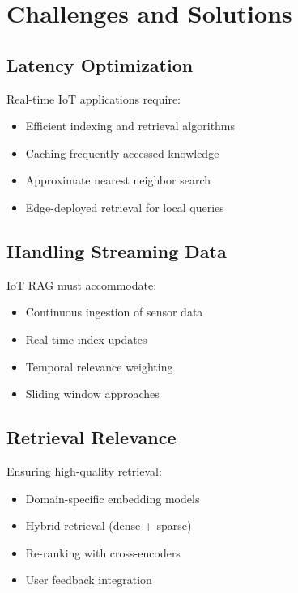 \documentclass[12pt,a4paper]{article}
\begin{document}
\section{Challenges and Solutions}

\subsection{Latency Optimization}

Real-time IoT applications require:
\begin{itemize}
    \item Efficient indexing and retrieval algorithms
    \item Caching frequently accessed knowledge
    \item Approximate nearest neighbor search
    \item Edge-deployed retrieval for local queries
\end{itemize}

\subsection{Handling Streaming Data}

IoT RAG must accommodate:
\begin{itemize}
    \item Continuous ingestion of sensor data
    \item Real-time index updates
    \item Temporal relevance weighting
    \item Sliding window approaches
\end{itemize}

\subsection{Retrieval Relevance}

Ensuring high-quality retrieval:
\begin{itemize}
    \item Domain-specific embedding models
    \item Hybrid retrieval (dense + sparse)
    \item Re-ranking with cross-encoders
    \item User feedback integration
\end{itemize}
\end{document}
